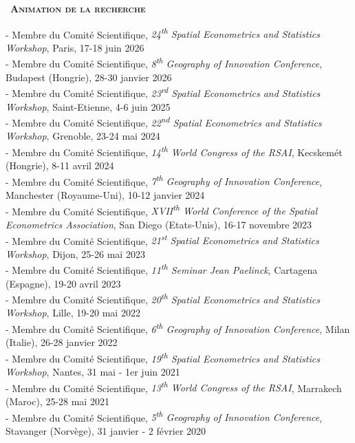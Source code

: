 \documentclass[a4paper,12pt]{article}
\newcommand{\smalltitre}[1]{%
	\noindent \textbullet~\textsc{\textbf{#1}}
	\smallskip
	}
\begin{document}

\smalltitre{Animation de la recherche} \medskip

\noindent - Membre du Comité Scientifique, \textit{24\textsuperscript{th} Spatial Econometrics and Statistics Workshop}, Paris, 17-18 juin 2026\\ 
- Membre du Comité Scientifique, \textit{8\textsuperscript{th} Geography of Innovation Conference}, Budapest (Hongrie), 28-30 janvier 2026	 \\
- Membre du Comité Scientifique, \textit{23\textsuperscript{rd} Spatial Econometrics and Statistics Workshop}, Saint-Etienne, 4-6 juin 2025\\ 
- Membre du Comité Scientifique, \textit{22\textsuperscript{nd} Spatial Econometrics and Statistics Workshop}, Grenoble, 23-24 mai 2024\\ 
- Membre du Comité Scientifique, \textit{14\textsuperscript{th} World Congress of the RSAI}, Kecskemét (Hongrie), 8-11 avril 2024\\
- Membre du Comité Scientifique, \textit{7\textsuperscript{th} Geography of Innovation Conference}, Manchester (Royaume-Uni), 10-12 janvier 2024\\
- Membre du Comité Scientifique, \textit{XVII\textsuperscript{th} World Conference of the Spatial Econometrics Association}, San Diego (Etats-Unis), 16-17 novembre 2023 \\
- Membre du Comité Scientifique, \textit{21\textsuperscript{st} Spatial Econometrics and Statistics Workshop}, Dijon, 25-26 mai 2023\\ 
- Membre du Comité Scientifique, \textit{11\textsuperscript{th} Seminar Jean Paelinck}, Cartagena (Espagne), 19-20 avril 2023\\ 
- Membre du Comité Scientifique, \textit{20\textsuperscript{th} Spatial Econometrics and Statistics Workshop}, Lille, 19-20 mai 2022\\  
- Membre du Comité Scientifique, \textit{6\textsuperscript{th} Geography of Innovation Conference}, Milan (Italie), 26-28 janvier 2022 \\
- Membre du Comité Scientifique, \textit{19\textsuperscript{th} Spatial Econometrics and Statistics Workshop}, Nantes, 31 mai - 1er juin 2021\\
- Membre du Comité Scientifique, \textit{13\textsuperscript{th} World Congress of the RSAI}, Marrakech (Maroc), 25-28 mai 2021\\
- Membre du Comité Scientifique, \textit{5\textsuperscript{th} Geography of Innovation Conference}, Stavanger (Norvège), 31 janvier - 2 février 2020	 \\
\end{document}
